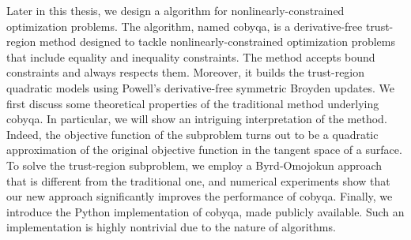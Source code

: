 Later in this thesis, we design a  algorithm for nonlinearly-constrained optimization problems.
The algorithm, named \gls{cobyqa}, is a derivative-free trust-region  method designed to tackle nonlinearly-constrained optimization problems that include equality and inequality constraints.
The method accepts bound constraints and always respects them.
Moreover, it builds the trust-region quadratic models using Powell's derivative-free symmetric Broyden updates.
We first discuss some theoretical properties of the traditional  method underlying \gls{cobyqa}.
In particular, we will show an intriguing interpretation of the  method.
Indeed, the objective function of the  subproblem turns out to be a quadratic approximation of the original objective function in the tangent space of a surface.
To solve the trust-region  subproblem, we employ a Byrd-Omojokun approach that is different from the traditional one, and numerical experiments show that our new approach significantly improves the performance of \gls{cobyqa}.
Finally, we introduce the Python implementation of \gls{cobyqa}, made publicly available.
Such an implementation is highly nontrivial due to the nature of  algorithms.
